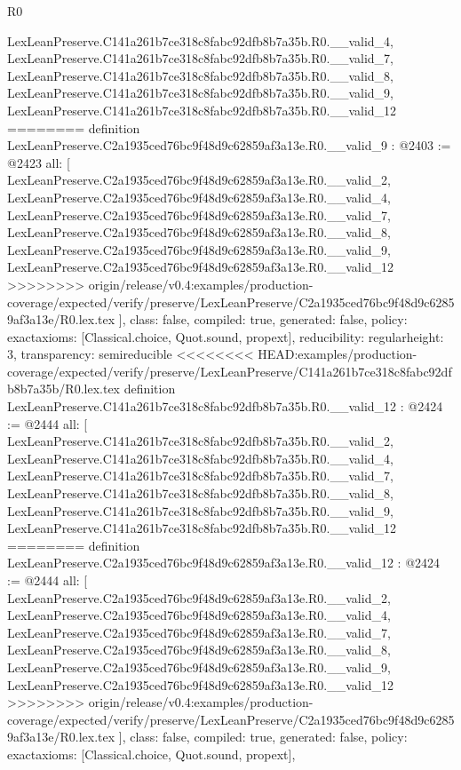 \begin{lexlean}{R0}
\begin{coremodule}
{{{{{{{{{{{{{{{{{{{{{{{{{{{{{{{{{{{{{{{{{{{{{{{{    LexLeanPreserve.C141a261b7ce318c8fabc92dfb8b7a35b.R0.__valid_4,
    LexLeanPreserve.C141a261b7ce318c8fabc92dfb8b7a35b.R0.__valid_7,
    LexLeanPreserve.C141a261b7ce318c8fabc92dfb8b7a35b.R0.__valid_8,
    LexLeanPreserve.C141a261b7ce318c8fabc92dfb8b7a35b.R0.__valid_9,
    LexLeanPreserve.C141a261b7ce318c8fabc92dfb8b7a35b.R0.__valid_12
========
definition LexLeanPreserve.C2a1935ced76bc9f48d9c62859af3a13e.R0.__valid_9 : @2403 := @2423 {
  all: [
    LexLeanPreserve.C2a1935ced76bc9f48d9c62859af3a13e.R0.__valid_2,
    LexLeanPreserve.C2a1935ced76bc9f48d9c62859af3a13e.R0.__valid_4,
    LexLeanPreserve.C2a1935ced76bc9f48d9c62859af3a13e.R0.__valid_7,
    LexLeanPreserve.C2a1935ced76bc9f48d9c62859af3a13e.R0.__valid_8,
    LexLeanPreserve.C2a1935ced76bc9f48d9c62859af3a13e.R0.__valid_9,
    LexLeanPreserve.C2a1935ced76bc9f48d9c62859af3a13e.R0.__valid_12
>>>>>>>> origin/release/v0.4:examples/production-coverage/expected/verify/preserve/LexLeanPreserve/C2a1935ced76bc9f48d9c62859af3a13e/R0.lex.tex
  ],
  class: false,
  compiled: true,
  generated: false,
  policy: exact{axioms: [Classical.choice, Quot.sound, propext]},
  reducibility: regular{height: 3},
  transparency: semireducible
}
<<<<<<<< HEAD:examples/production-coverage/expected/verify/preserve/LexLeanPreserve/C141a261b7ce318c8fabc92dfb8b7a35b/R0.lex.tex
definition LexLeanPreserve.C141a261b7ce318c8fabc92dfb8b7a35b.R0.__valid_12 : @2424 := @2444 {
  all: [
    LexLeanPreserve.C141a261b7ce318c8fabc92dfb8b7a35b.R0.__valid_2,
    LexLeanPreserve.C141a261b7ce318c8fabc92dfb8b7a35b.R0.__valid_4,
    LexLeanPreserve.C141a261b7ce318c8fabc92dfb8b7a35b.R0.__valid_7,
    LexLeanPreserve.C141a261b7ce318c8fabc92dfb8b7a35b.R0.__valid_8,
    LexLeanPreserve.C141a261b7ce318c8fabc92dfb8b7a35b.R0.__valid_9,
    LexLeanPreserve.C141a261b7ce318c8fabc92dfb8b7a35b.R0.__valid_12
========
definition LexLeanPreserve.C2a1935ced76bc9f48d9c62859af3a13e.R0.__valid_12 : @2424 := @2444 {
  all: [
    LexLeanPreserve.C2a1935ced76bc9f48d9c62859af3a13e.R0.__valid_2,
    LexLeanPreserve.C2a1935ced76bc9f48d9c62859af3a13e.R0.__valid_4,
    LexLeanPreserve.C2a1935ced76bc9f48d9c62859af3a13e.R0.__valid_7,
    LexLeanPreserve.C2a1935ced76bc9f48d9c62859af3a13e.R0.__valid_8,
    LexLeanPreserve.C2a1935ced76bc9f48d9c62859af3a13e.R0.__valid_9,
    LexLeanPreserve.C2a1935ced76bc9f48d9c62859af3a13e.R0.__valid_12
>>>>>>>> origin/release/v0.4:examples/production-coverage/expected/verify/preserve/LexLeanPreserve/C2a1935ced76bc9f48d9c62859af3a13e/R0.lex.tex
  ],
  class: false,
  compiled: true,
  generated: false,
  policy: exact{axioms: [Classical.choice, Quot.sound, propext]},
}}}}}}}}}}}}}}}}}}}}}}}}}}}}}}}}}}}}}}}}}}}}}}}}}}
\end{coremodule}
\end{lexlean}
